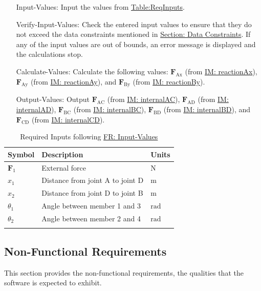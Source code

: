\documentclass[12pt]{article}
\begin{document}
\begin{itemize}
\item[Input-Values:\phantomsection\label{inputValues}]{Input the values from \hyperref[Table:ReqInputs]{Table:ReqInputs}.}
\item[Verify-Input-Values:\phantomsection\label{verifyInVals}]{Check the entered input values to ensure that they do not exceed the data constraints mentioned in \hyperref[Sec:DataConstraints]{Section: Data Constraints}. If any of the input values are out of bounds, an error message is displayed and the calculations stop.}
\item[Calculate-Values:\phantomsection\label{calcValues}]{Calculate the following values: ${\mathbf{F}_{\text{Ax}}}$ (from \hyperref[IM:reactionAx]{IM: reactionAx}), ${\mathbf{F}_{\text{Ay}}}$ (from \hyperref[IM:reactionAy]{IM: reactionAy}), and ${\mathbf{F}_{\text{By}}}$ (from \hyperref[IM:reactionBy]{IM: reactionBy}).}
\item[Output-Values:\phantomsection\label{outputValues}]{Output ${\mathbf{F}_{\text{AC}}}$ (from \hyperref[IM:internalAC]{IM: internalAC}), ${\mathbf{F}_{\text{AD}}}$ (from \hyperref[IM:internalAD]{IM: internalAD}), ${\mathbf{F}_{\text{BC}}}$ (from \hyperref[IM:internalBC]{IM: internalBC}), ${\mathbf{F}_{\text{BD}}}$ (from \hyperref[IM:internalBD]{IM: internalBD}), and ${\mathbf{F}_{\text{CD}}}$ (from \hyperref[IM:internalCD]{IM: internalCD}).}
\end{itemize}
\begin{longtable}{l l l}
\toprule
\textbf{Symbol} & \textbf{Description} & \textbf{Units}
\\
\midrule
\endhead
${\mathbf{F}_{1}}$ & External force & ${\text{N}}$
\\
${x_{\text{1}}}$ & Distance from joint A to joint D & ${\text{m}}$
\\
${x_{\text{2}}}$ & Distance from joint D to joint B & ${\text{m}}$
\\
${θ_{\text{1}}}$ & Angle between member 1 and 3 & ${\text{rad}}$
\\
${θ_{\text{2}}}$ & Angle between member 2 and 4 & ${\text{rad}}$
\\
\bottomrule
\caption{Required Inputs following \hyperref[inputValues]{FR: Input-Values}}
\label{Table:ReqInputs}
\end{longtable}
\subsection{Non-Functional Requirements}
\label{Sec:NFRs}
This section provides the non-functional requirements, the qualities that the software is expected to exhibit.
\end{document}

